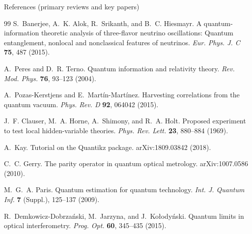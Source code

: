 \documentclass[aspectratio=169]{beamer}
\begin{document}
\begin{frame}{References (primary reviews and key papers)}
\begin{thebibliography}{99}
S.~Banerjee, A.~K. Alok, R.~Srikanth, and B.~C. Hiesmayr.
\newblock A quantum-information theoretic analysis of three-flavor neutrino oscillations:
Quantum entanglement, nonlocal and nonclassical features of neutrinos.
\newblock \emph{Eur. Phys. J. C} \textbf{75}, 487 (2015).

A.~Peres and D.~R. Terno.
\newblock Quantum information and relativity theory.
\newblock \emph{Rev. Mod. Phys.} \textbf{76}, 93--123 (2004).

A.~Pozas-Kerstjens and E.~Mart\'in-Mart\'inez.
\newblock Harvesting correlations from the quantum vacuum.
\newblock \emph{Phys. Rev. D} \textbf{92}, 064042 (2015).

J.~F. Clauser, M.~A. Horne, A.~Shimony, and R.~A. Holt.
\newblock Proposed experiment to test local hidden-variable theories.
\newblock \emph{Phys. Rev. Lett.} \textbf{23}, 880--884 (1969).

A.~Kay.
\newblock Tutorial on the Quantikz package.
\newblock arXiv:1809.03842 (2018).

C.~C. Gerry.
\newblock The parity operator in quantum optical metrology.
\newblock arXiv:1007.0586 (2010).

M.~G.~A. Paris.
\newblock Quantum estimation for quantum technology.
\newblock \emph{Int. J. Quantum Inf.} \textbf{7} (Suppl.), 125--137 (2009).

R.~Demkowicz-Dobrza{\'n}ski, M.~Jarzyna, and J.~Ko{\l}ody{\'n}ski.
\newblock Quantum limits in optical interferometry.
\newblock \emph{Prog. Opt.} \textbf{60}, 345--435 (2015).

\end{thebibliography}
\end{frame}

\end{document}
